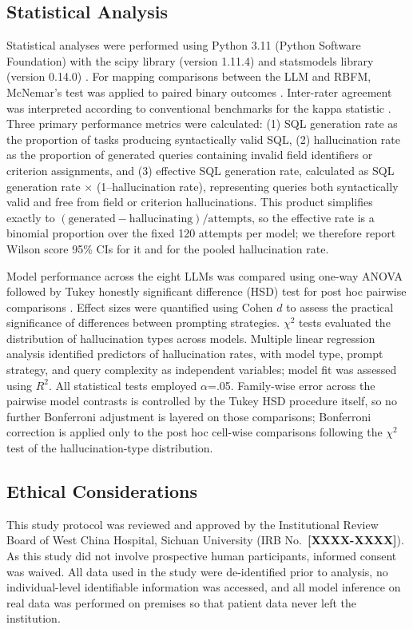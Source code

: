 \documentclass[applsci,article,submit,pdftex,oneauthor]{Definitions/mdpi}
\newcommand{\PH}[1]{{\color{red}\textbf{[#1]}}}
\begin{document}
\subsection{Statistical Analysis}
Statistical analyses were performed using Python 3.11 (Python Software
Foundation) with the scipy library (version 1.11.4) \cite{scipy2020} and
statsmodels library (version 0.14.0) \cite{statsmodels2010}. For mapping
comparisons between the LLM and RBFM, McNemar's test was applied to paired binary
outcomes \cite{mcnemar1947}. Inter-rater agreement was interpreted according to
conventional benchmarks for the kappa statistic \cite{landis1977}. Three primary performance
metrics were calculated: (1) SQL generation rate as the proportion of tasks
producing syntactically valid SQL, (2) hallucination rate as the proportion of
generated queries containing invalid field identifiers or criterion assignments,
and (3) effective SQL generation rate, calculated as SQL generation rate $\times$ (1--hallucination rate), representing queries both syntactically valid and free from field or criterion hallucinations. This product simplifies exactly to $(\text{generated}-\text{hallucinating})/\text{attempts}$, so the effective rate is a binomial proportion over the fixed 120 attempts per model; we therefore report Wilson score 95\% CIs for it and for the pooled hallucination rate.

Model performance across the eight LLMs was compared using one-way ANOVA
followed by Tukey honestly significant difference (HSD) test for post hoc
pairwise comparisons \cite{tukey1949}. Effect sizes were quantified using Cohen $d$ to assess the
practical significance of differences between prompting strategies. $\chi^2$
tests evaluated the distribution of hallucination types across models. Multiple
linear regression analysis identified predictors of hallucination rates, with
model type, prompt strategy, and query complexity as independent variables;
model fit was assessed using $R^2$. All statistical tests employed $\alpha$=.05. Family-wise error across the pairwise model contrasts is controlled by the Tukey HSD procedure itself, so no further Bonferroni adjustment is layered on those comparisons; Bonferroni correction is applied only to the post hoc cell-wise comparisons following the $\chi^2$ test of the hallucination-type distribution.

\subsection{Ethical Considerations}
This study protocol was reviewed and approved by the Institutional Review Board
of West China Hospital, Sichuan University (IRB No.\ \PH{XXXX-XXXX}). As this study did not involve
prospective human participants, informed consent was waived. All data used in
the study were de-identified prior to analysis, no individual-level identifiable
information was accessed, and all model inference on real data was performed on
premises so that patient data never left the institution.
\end{document}
